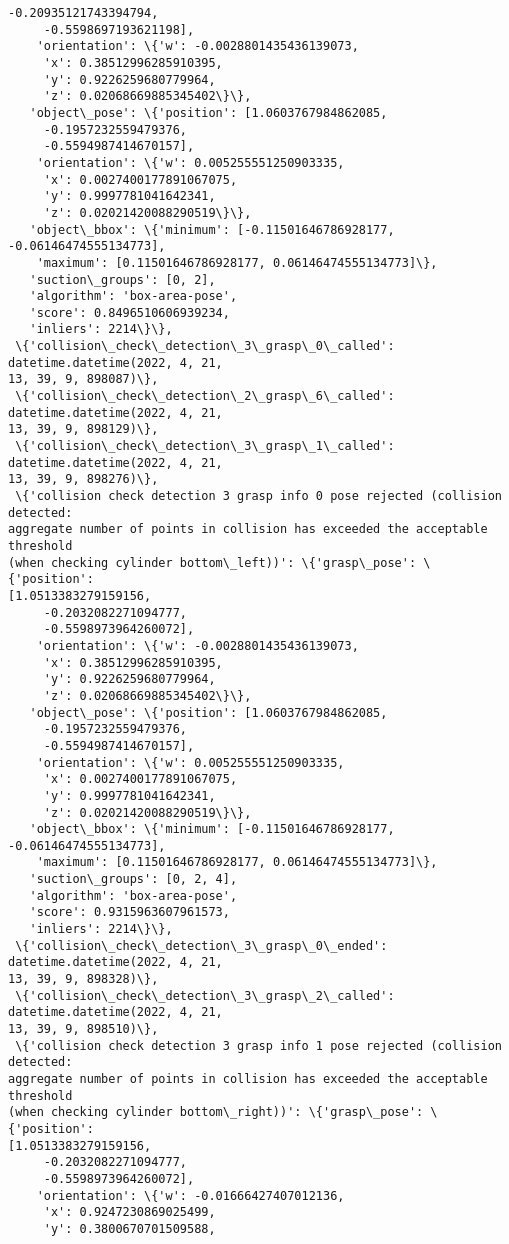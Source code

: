\documentclass[11pt]{article}
\begin{document}
\begin{tcolorbox}[breakable, size=fbox, boxrule=.5pt, pad at break*=1mm, opacityfill=0]
\begin{Verbatim}[commandchars=\\\{\}]
     -0.20935121743394794,
     -0.5598697193621198],
    'orientation': \{'w': -0.0028801435436139073,
     'x': 0.38512996285910395,
     'y': 0.9226259680779964,
     'z': 0.02068669885345402\}\},
   'object\_pose': \{'position': [1.0603767984862085,
     -0.1957232559479376,
     -0.5594987414670157],
    'orientation': \{'w': 0.005255551250903335,
     'x': 0.0027400177891067075,
     'y': 0.9997781041642341,
     'z': 0.02021420088290519\}\},
   'object\_bbox': \{'minimum': [-0.11501646786928177, -0.06146474555134773],
    'maximum': [0.11501646786928177, 0.06146474555134773]\},
   'suction\_groups': [0, 2],
   'algorithm': 'box-area-pose',
   'score': 0.8496510606939234,
   'inliers': 2214\}\},
 \{'collision\_check\_detection\_3\_grasp\_0\_called': datetime.datetime(2022, 4, 21,
13, 39, 9, 898087)\},
 \{'collision\_check\_detection\_2\_grasp\_6\_called': datetime.datetime(2022, 4, 21,
13, 39, 9, 898129)\},
 \{'collision\_check\_detection\_3\_grasp\_1\_called': datetime.datetime(2022, 4, 21,
13, 39, 9, 898276)\},
 \{'collision check detection 3 grasp info 0 pose rejected (collision detected:
aggregate number of points in collision has exceeded the acceptable threshold
(when checking cylinder bottom\_left))': \{'grasp\_pose': \{'position':
[1.0513383279159156,
     -0.2032082271094777,
     -0.5598973964260072],
    'orientation': \{'w': -0.0028801435436139073,
     'x': 0.38512996285910395,
     'y': 0.9226259680779964,
     'z': 0.02068669885345402\}\},
   'object\_pose': \{'position': [1.0603767984862085,
     -0.1957232559479376,
     -0.5594987414670157],
    'orientation': \{'w': 0.005255551250903335,
     'x': 0.0027400177891067075,
     'y': 0.9997781041642341,
     'z': 0.02021420088290519\}\},
   'object\_bbox': \{'minimum': [-0.11501646786928177, -0.06146474555134773],
    'maximum': [0.11501646786928177, 0.06146474555134773]\},
   'suction\_groups': [0, 2, 4],
   'algorithm': 'box-area-pose',
   'score': 0.9315963607961573,
   'inliers': 2214\}\},
 \{'collision\_check\_detection\_3\_grasp\_0\_ended': datetime.datetime(2022, 4, 21,
13, 39, 9, 898328)\},
 \{'collision\_check\_detection\_3\_grasp\_2\_called': datetime.datetime(2022, 4, 21,
13, 39, 9, 898510)\},
 \{'collision check detection 3 grasp info 1 pose rejected (collision detected:
aggregate number of points in collision has exceeded the acceptable threshold
(when checking cylinder bottom\_right))': \{'grasp\_pose': \{'position':
[1.0513383279159156,
     -0.2032082271094777,
     -0.5598973964260072],
    'orientation': \{'w': -0.01666427407012136,
     'x': 0.9247230869025499,
     'y': 0.3800670701509588,

\end{Verbatim}
\end{tcolorbox}
\end{document}
